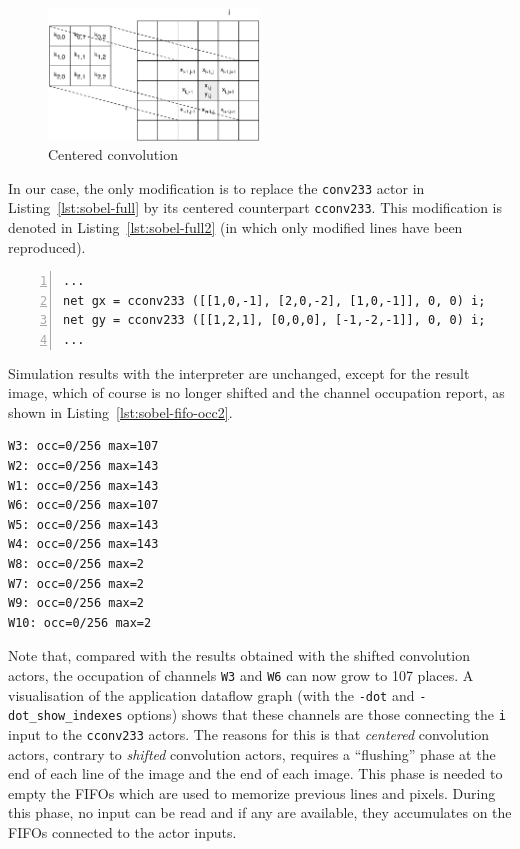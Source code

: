 \begin{figure}[htbp]
\centering
    \includegraphics[width=0.5\textwidth]{./figs/cconv.pdf}
  \caption{Centered convolution}
  \label{fig:centered-conv}
\end{figure}

In our case, the only modification is to replace the \verb|conv233| actor in
Listing~\ref{lst:sobel-full} by its centered counterpart \verb|cconv233|. This modification is
denoted in Listing~\ref{lst:sobel-full2} (in which only modified lines have been reproduced).
 
\begin{lstlisting}[style=CaphStyle,numbers=left,caption={Modification of
    listing~\ref{lst:sobel-full} to use \emph{centered} convolution},label={lst:sobel-full2}]
...
net gx = cconv233 ([[1,0,-1], [2,0,-2], [1,0,-1]], 0, 0) i;
net gy = cconv233 ([[1,2,1], [0,0,0], [-1,-2,-1]], 0, 0) i;
...
\end{lstlisting}

\medskip
Simulation results with the interpreter are unchanged, except for the result image, which of course is no longer
shifted and the channel occupation report, as shown in Listing~\ref{lst:sobel-fifo-occ2}.

\begin{lstlisting}[style=BashOutputStyle,caption={FIFO occupation reported by the interpreter for
    the application using centered convolution actors},label={lst:sobel-fifo-occ2}]
W3: occ=0/256 max=107
W2: occ=0/256 max=143
W1: occ=0/256 max=143
W6: occ=0/256 max=107
W5: occ=0/256 max=143
W4: occ=0/256 max=143
W8: occ=0/256 max=2
W7: occ=0/256 max=2
W9: occ=0/256 max=2
W10: occ=0/256 max=2
\end{lstlisting}

Note that, compared with the results obtained with the shifted convolution actors, the occupation of
channels \texttt{W3} and \texttt{W6} can now grow to 107 places. A visualisation of the application
dataflow graph (with the \verb|-dot| and \verb|-dot_show_indexes| options) shows that these channels
are those connecting the \texttt{i} input to the \texttt{cconv233} actors. The reasons for this is
that \emph{centered} convolution actors, contrary to \emph{shifted} convolution actors, requires a
``flushing'' phase at the end of each line of the image and the end of each image. This phase is
needed to empty the FIFOs which are used to memorize previous lines and pixels. During this phase,
no input can be read and if any are available, they accumulates on the FIFOs connected to the actor
inputs. 

